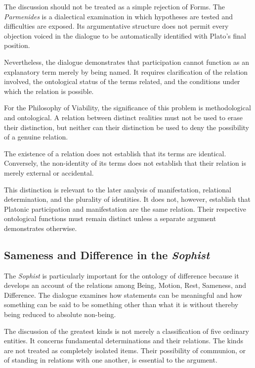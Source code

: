 The discussion should not be treated as a simple rejection of Forms.
The \textit{Parmenides} is a dialectical examination in which hypotheses
are tested and difficulties are exposed. Its argumentative structure
does not permit every objection voiced in the dialogue to be
automatically identified with Plato's final position.

Nevertheless, the dialogue demonstrates that participation cannot
function as an explanatory term merely by being named. It requires
clarification of the relation involved, the ontological status of the
terms related, and the conditions under which the relation is possible.

For the Philosophy of Viability, the significance of this problem is
methodological and ontological. A relation between distinct realities
must not be used to erase their distinction, but neither can their
distinction be used to deny the possibility of a genuine relation.

The existence of a relation does not establish that its terms are
identical. Conversely, the non-identity of its terms does not establish
that their relation is merely external or accidental.

This distinction is relevant to the later analysis of manifestation,
relational determination, and the plurality of identities. It does not,
however, establish that Platonic participation and manifestation are
the same relation. Their respective ontological functions must remain
distinct unless a separate argument demonstrates otherwise.

\subsection{Sameness and Difference in the \textit{Sophist}}

The \textit{Sophist} is particularly important for the ontology of
difference because it develops an account of the relations among
Being, Motion, Rest, Sameness, and Difference. The dialogue examines
how statements can be meaningful and how something can be said to be
something other than what it is without thereby being reduced to
absolute non-being.

The discussion of the greatest kinds is not merely a classification of
five ordinary entities. It concerns fundamental determinations and
their relations. The kinds are not treated as completely isolated
items. Their possibility of communion, or of standing in relations
with one another, is essential to the argument.

